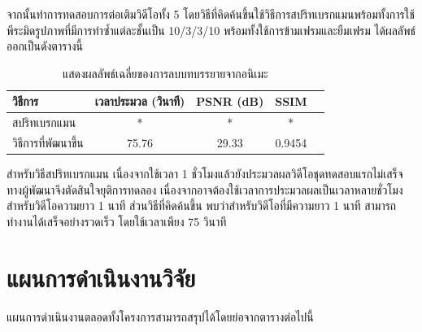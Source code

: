 \documentclass[hidelinks, a4paper,12pt]{article}
\numberwithin{equation}{section}							%
\numberwithin{equation}{section}
\begin{document}
{	\hspace{1cm}  จากนั้นทำการทดสอบการต่อเติมวิดีโอทั้ง 5 โดยวิธีที่คิดค้นขึ้นใช้วิธีการสปริทเบรกแมนพร้อมทั้งการใช้พีระมิดรูปภาพที่มีการทำซ้ำแต่ละชั้นเป็น 10/3/3/10  พร้อมทั้งใช้การข้ามเฟรมและยืมเฟรม ได้ผลลัพธ์ออกเป็นดังตารางนี้
	 
\begin{table}[H]
	\centering
	\begin{tabular}[ht]{|l|c|c|c|c|}
		\hline
		วิธีการ  & เวลาประมวล  (วินาที) & PSNR (dB) & SSIM \\
		\hline
		สปริทเบรกแมน & * & * & * \\
		วิธีการที่พัฒนาขึ้น & 75.76 & 29.33 & 0.9454 \\
		\hline
	\end{tabular}
	\caption{แสดงผลลัพธ์เฉลี่ยของการลบบทบรรยายจากอนิเมะ}
\end{table}	

\hspace{1cm} สำหรับวิธีสปริทเบรกแมน เนื่องจากใช้เวลา 1 ชั่วโมงแล้วยังประมวลผลวิดีโอชุดทดสอบแรกไม่เสร็จ ทางผู้พัฒนาจึงตัดสินใจยุติการทดลอง เนื่องจากอาจต้องใช้เวลาการประมวลผลเป็นเวลาหลายชั่วโมงสำหรับวิดีโอความยาว 1 นาที ส่วนวิธีที่คิดค้นขึ้น พบว่าสำหรับวิดีโอที่มีความยาว 1 นาที สามารถทำงานได้เสร็จอย่างรวดเร็ว โดยใช้เวลาเพียง 75 วินาที

\section{แผนการดำเนินงานวิจัย}
\hspace{1cm} แผนการดำเนินงานตลอดทั้งโครงการสามารถสรุปได้โดยย่อจากตารางต่อไปนี้
\begin{center}
\end{center}


}
\end{document}
